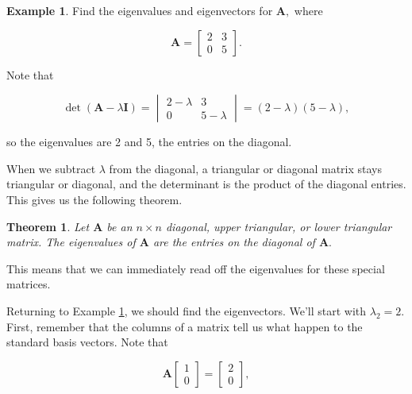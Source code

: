 \documentclass[
]{book}
\newtheorem{theorem}{Theorem}[chapter]
\theoremstyle{definition}
\theoremstyle{definition}
\newtheorem{example}{Example}[chapter]
\theoremstyle{definition}
\theoremstyle{definition}
\theoremstyle{remark}
\begin{document}
\begin{examplebox}

\begin{example}
\protect\hypertarget{exm:tmev}{}\label{exm:tmev}Find the eigenvalues and eigenvectors for \(\mathbf{A},\) where

\[\mathbf{A}=\begin{bmatrix}2 & 3\\0 & 5\end{bmatrix}.\]

Note that

\[\det(\mathbf{A}-\lambda \mathbf{I})=\begin{vmatrix}2-\lambda & 3\\0 & 5-\lambda\end{vmatrix}=(2-\lambda)(5-\lambda),\]

so the eigenvalues are 2 and 5, the entries on the diagonal.
\end{example}

\end{examplebox}

When we subtract \(\lambda\) from the diagonal, a triangular or diagonal matrix stays triangular or diagonal, and the determinant is the product of the diagonal entries. This gives us the following theorem.

\begin{theorembox}

\begin{theorem}
Let \(\mathbf{A}\) be an \(n\times n\) diagonal, upper triangular, or lower triangular matrix. The eigenvalues of \(\mathbf{A}\) are the entries on the diagonal of \(\mathbf{A}.\)
\end{theorem}

\end{theorembox}

This means that we can immediately read off the eigenvalues for these special matrices.

Returning to Example \ref{exm:tmev}, we should find the eigenvectors. We'll start with \(\lambda_2=2.\) First, remember that the columns of a matrix tell us what happen to the standard basis vectors. Note that

\[\mathbf{A}\begin{bmatrix}1 \\0\end{bmatrix}=\begin{bmatrix}2\\0\end{bmatrix},\]
\end{document}
